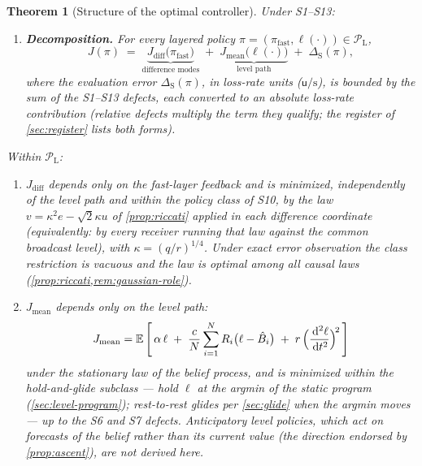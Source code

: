 \documentclass[11pt, a4paper]{article}
\theoremstyle{definition}
\theoremstyle{plain}
\newtheorem{theorem}{Theorem}[section]
\theoremstyle{remark}
\newcommand{\E}{\mathbb{E}}
\newcommand{\dd}{\,\mathrm{d}}
\begin{document}
\begin{theorem}[Structure of the optimal controller]\label{thm:structure}
Under S1--S13:
\begin{enumerate}[label=(\alph*)]
  \item[(0)] \textbf{Decomposition.}  For every layered policy
    $\pi = (\pi_{\mathrm{fast}}, \ell(\cdot)) \in
    \mathcal{P}_{\mathrm{L}}$,
    \[
      J(\pi)
      \;=\;
      \underbrace{J_{\mathrm{diff}}\bigl(\pi_{\mathrm{fast}}\bigr)}_{
        \text{difference modes}}
      \;+\;
      \underbrace{J_{\mathrm{mean}}\bigl(\ell(\cdot)\bigr)}_{
        \text{level path}}
      \;+\; \Delta_{\mathrm{S}}(\pi),
    \]
    where the evaluation error $\Delta_{\mathrm{S}}(\pi)$, in
    loss-rate units ($\mathsf{u}/\mathrm{s}$), is bounded by the sum
    of the S1--S13 defects, each converted to an absolute loss-rate contribution
    (relative defects multiply the term they qualify; the register of
    \cref{sec:register} lists both forms).
\end{enumerate}
Within $\mathcal{P}_{\mathrm{L}}$:
\begin{enumerate}[label=(\roman*)]
  \item $J_{\mathrm{diff}}$ depends only on the fast-layer feedback
    and is minimized, independently of the level path and within the
    policy class of S10, by the law $v = \kappa^2 e - \sqrt2\kappa u$
    of \cref{prop:riccati} applied in each difference coordinate
    (equivalently: by every receiver running that law against the
    common broadcast level), with $\kappa = (q/r)^{1/4}$.  Under exact
    error observation the class restriction is vacuous and the law is
    optimal among all causal laws
    (\cref{prop:riccati,rem:gaussian-role}).
  \item $J_{\mathrm{mean}}$ depends only on the level path:
    \begin{equation}\label{eq:mean-objective}
      J_{\mathrm{mean}}
      = \E\left[\,\alpha\,\ell
        \;+\; \frac{c}{N}\sum_{i=1}^N R_i\bigl(\ell - \hat B_i\bigr)
        \;+\; r\,\Bigl(\frac{\dd^2\ell}{\dd t^2}\Bigr)^{\!2}\,\right]
    \end{equation}
    under the stationary law of the belief process, and is minimized
    \emph{within the hold-and-glide subclass} --- hold $\ell$ at the
    argmin of the static program (\cref{sec:level-program});
    rest-to-rest glides per \cref{sec:glide} when the argmin moves ---
    up to the S6 and S7 defects.  Anticipatory level policies, which
    act on forecasts of the belief rather than its current value (the
    direction endorsed by \cref{prop:ascent}), are not derived here.
\end{enumerate}
\end{theorem}
\end{document}
